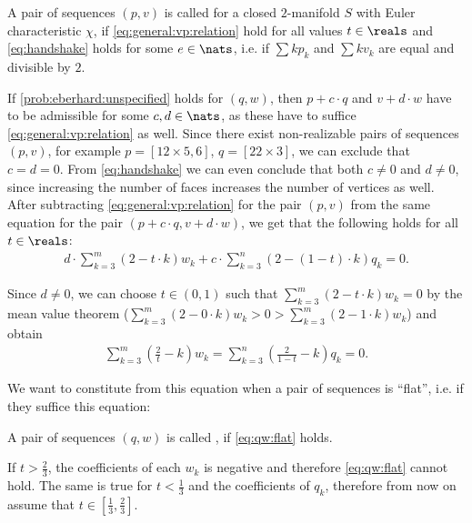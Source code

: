 \begin{definition} A pair of sequences $(p, v)$ is called  for a closed $2$-manifold $S$ with {\sc Euler} characteristic $\chi$, if \eqref{eq:general:vp:relation} hold for all values $t \in \reals$ and \eqref{eq:handshake} holds for some $e \in \nats$, i.e. if $\sum k p_k$ and $\sum k v_k$ are equal and divisible by $2$.
\end{definition}

If \autoref{prob:eberhard:unspecified} holds for $(q, w)$, then $p + c \cdot q$ and $v + d \cdot w$ have to be admissible for some $c,d \in \nats$, as these have to suffice \eqref{eq:general:vp:relation} as well. Since there exist non-realizable pairs of sequences $(p, v)$, for example $p = [12 \times 5, 6]$, $q = [22 \times 3]$, we can exclude that $c = d = 0$. From \eqref{eq:handshake} we can even conclude that both $c \neq 0$ and $d \neq 0$, since increasing the number of faces increases the number of vertices as well. After subtracting \eqref{eq:general:vp:relation} for the pair $(p, v)$ from the same equation for the pair $(p + c \cdot q, v + d \cdot w)$, we get that the following holds for all $t \in \reals$:
\begin{align*}
  d \cdot \sum_{k=3}^m \left(2 - t \cdot k \right) w_k + c \cdot \sum_{k=3}^n \left( 2 - (1 - t) \cdot k \right) q_k = 0. 
\end{align*}

Since $d \neq 0$, we can choose $t \in (0, 1)$ such that $\sum_{k=3}^m (2 - t \cdot k) w_k = 0$ by the mean value theorem ($\sum_{k=3}^m (2 - 0 \cdot k) w_k > 0 > \sum_{k=3}^m (2 - 1 \cdot k) w_k$) and obtain
\begin{align}
    \sum_{k=3}^m \left(\frac{2}{t} - k \right) w_k = \sum_{k=3}^n \left( \frac{2}{1-t} - k \right) q_k = 0. \label{eq:qw:flat}
\end{align}

We want to constitute from this equation when a pair of sequences is ``flat'', i.e. if they suffice this equation:

\begin{definition}
  A pair of sequences $(q, w)$ is called , if \eqref{eq:qw:flat} holds.
\end{definition}

If $t > \frac{2}{3}$, the coefficients of each $w_k$ is negative and therefore \eqref{eq:qw:flat} cannot hold. The same is true for $t < \frac{1}{3}$ and the coefficients of $q_k$, therefore from now on assume that $t \in \left[\frac{1}{3}, \frac{2}{3}\right]$.

